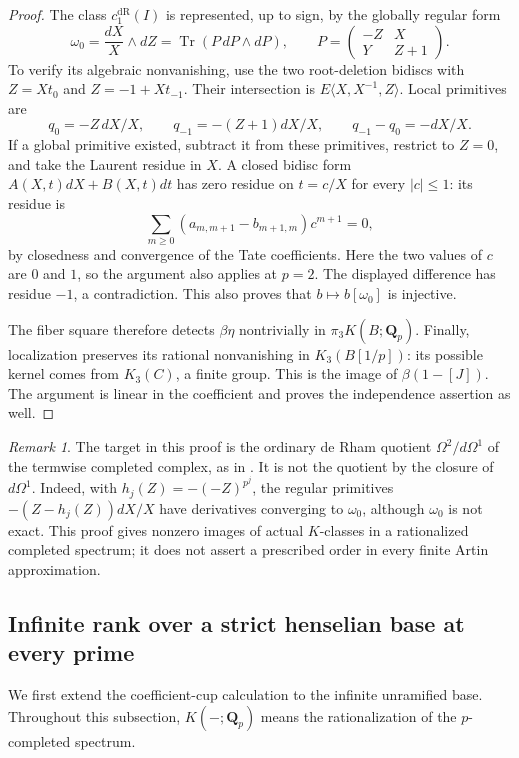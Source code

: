 \documentclass[11pt,a4paper]{amsart}
\numberwithin{equation}{section}
\theoremstyle{definition}
\theoremstyle{remark}
\newtheorem{remark}[theorem]{Remark}
\begin{document}
\begin{proof}
The class $c_1^{\mathrm{dR}}(I)$ is represented, up to sign, by the
globally regular form
\[
 \omega_0=\frac{dX}{X}\wedge dZ
 =\operatorname{Tr}(P\,dP\wedge dP),\qquad
 P=\begin{pmatrix}-Z&X\\Y&Z+1\end{pmatrix}.
\]
To verify its algebraic nonvanishing, use the two root-deletion
bidiscs with $Z=Xt_0$ and $Z=-1+Xt_{-1}$. Their intersection is
$E\langle X,X^{-1},Z\rangle$. Local primitives are
\[
 q_0=-Z\,dX/X,\qquad q_{-1}=-(Z+1)dX/X,
 \qquad q_{-1}-q_0=-dX/X.
\]
If a global primitive existed, subtract it from these primitives,
restrict to $Z=0$, and take the Laurent residue in $X$. A closed
bidisc form $A(X,t)dX+B(X,t)dt$ has zero residue on $t=c/X$ for
every $|c|\le1$: its residue is
\[
 \sum_{m\ge0}(a_{m,m+1}-b_{m+1,m})c^{m+1}=0,
\]
by closedness and convergence of the Tate coefficients. Here the
two values of $c$ are $0$ and $1$, so the argument also applies at
$p=2$. The displayed difference has residue $-1$, a contradiction.
This also proves that $b\mapsto b[\omega_0]$ is injective.

The fiber square therefore detects $\beta\eta$ nontrivially in
$\pi_3K(B;\mathbf Q_p)$. Finally, localization preserves its rational
nonvanishing in $K_3(B[1/p])$: its possible kernel comes from
$K_3(C)$, a finite group. This is the image of $\beta(1-[J])$.
The argument is linear in the coefficient and proves the independence
assertion as well.
\end{proof}

\begin{remark}
The target in this proof is the ordinary de Rham quotient
$\Omega^2/d\Omega^1$ of the termwise completed complex, as in
\cite[Constructions~4.6 and~4.11]{AMMN}. It is not the quotient by
the closure of $d\Omega^1$. Indeed, with
$h_j(Z)=-(-Z)^{p^j}$, the regular primitives
$-(Z-h_j(Z))dX/X$ have derivatives converging to $\omega_0$, although
$\omega_0$ is not exact. This proof gives nonzero images of actual
$K$-classes in a rationalized completed spectrum; it does not assert
a prescribed order in every finite Artin approximation.
\end{remark}


\subsection{Infinite rank over a strict henselian base at every prime}
\label{d3:sec:directtcstrictallprimes}

We first extend the coefficient-cup calculation to the infinite
unramified base. Throughout this subsection, $K(-;\mathbf Q_p)$ means
the rationalization of the $p$-completed spectrum.
\end{document}
